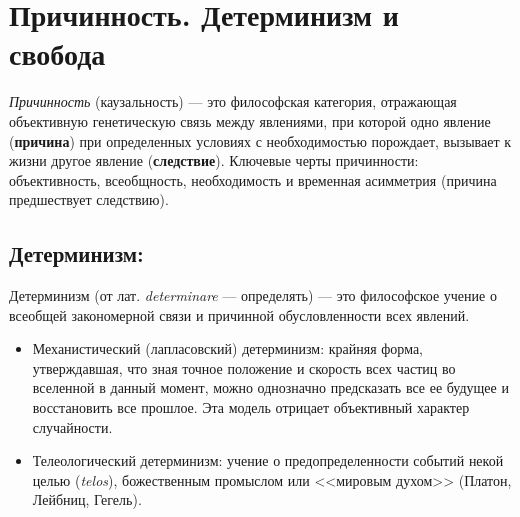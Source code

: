 \documentclass[12pt,a4paper]{article}
\begin{document}
	\section{Причинность. Детерминизм и свобода~\checkmark}
	
	\textit{Причинность} (каузальность) — это философская категория, отражающая объективную генетическую связь между явлениями, при которой одно явление (\textbf{причина}) при определенных условиях с необходимостью порождает, вызывает к жизни другое явление (\textbf{следствие}). Ключевые черты причинности: объективность, всеобщность, необходимость и временная асимметрия (причина предшествует следствию).
	
	\subsection{Детерминизм:}
	Детерминизм (от лат. \textit{determinare} — определять) — это философское учение о всеобщей закономерной связи и причинной обусловленности всех явлений.
	\begin{itemize}
		\item Механистический (лапласовский) детерминизм: крайняя форма, утверждавшая, что зная точное положение и скорость всех частиц во вселенной в данный момент, можно однозначно предсказать все ее будущее и восстановить все прошлое. Эта модель отрицает объективный характер случайности.
		\item Телеологический детерминизм: учение о предопределенности событий некой целью (\textit{telos}), божественным промыслом или <<мировым духом>> (Платон, Лейбниц, Гегель).
	\end{itemize}
	
\end{document}
